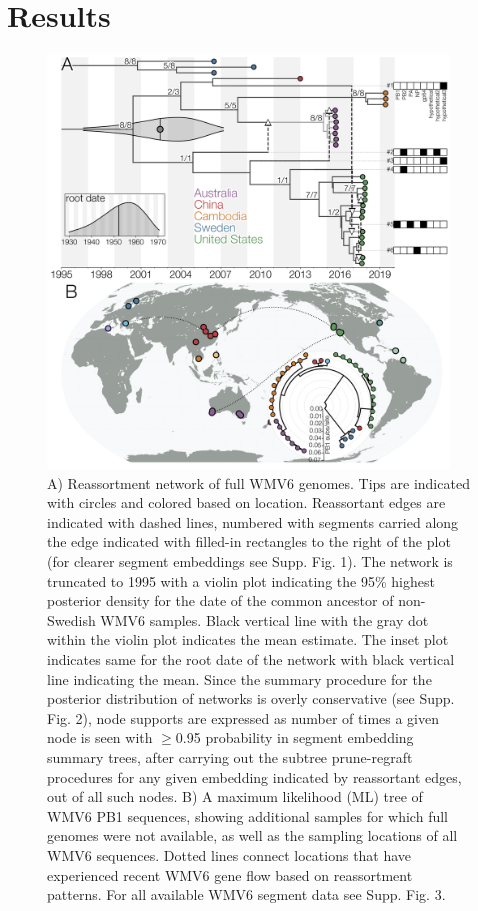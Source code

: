 \documentclass[11pt,twocolumn]{article}
\begin{document}
\section{Results}

\begin{figure}
  \centering
  \includegraphics[width=0.95\textwidth]{Fig1_tracking.png}
  \caption{
    A) Reassortment network of full WMV6 genomes. Tips are indicated with circles and colored based on location. Reassortant edges are indicated with dashed lines, numbered with segments carried along the edge indicated with filled-in rectangles to the right of the plot (for clearer segment embeddings see Supp. Fig. 1). The network is truncated to 1995 with a violin plot indicating the 95\% highest posterior density for the date of the common ancestor of non-Swedish WMV6 samples. Black vertical line with the gray dot within the violin plot indicates the mean estimate. The inset plot indicates same for the root date of the network with black vertical line indicating the mean. Since the summary procedure for the posterior distribution of networks is overly conservative (see Supp. Fig. 2), node supports are expressed as number of times a given node is seen with $\geq$0.95 probability in segment embedding summary trees, after carrying out the subtree prune-regraft procedures for any given embedding indicated by reassortant edges, out of all such nodes.
    B) A maximum likelihood (ML) tree of WMV6 PB1 sequences, showing additional samples for which full genomes were not available, as well as the sampling locations of all WMV6 sequences. Dotted lines connect locations that have experienced recent WMV6 gene flow based on reassortment patterns. For all available WMV6 segment data see Supp. Fig. 3.
    }
    \label{fig:tracking}
\end{figure}
\end{document}
